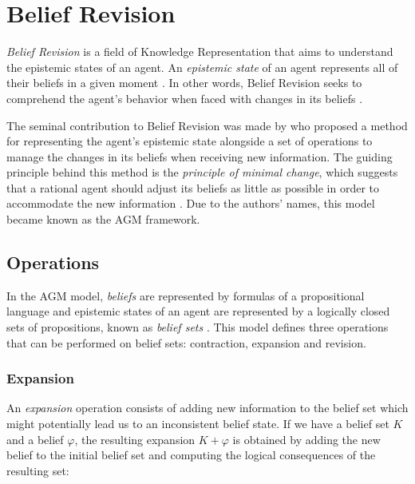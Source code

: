 
\chapter{Belief Revision}

\textit{Belief Revision} is a field of Knowledge Representation that aims to understand the epistemic states of an agent. An \textit{epistemic state} of an agent represents all of their beliefs in a given moment \citep{Ribeiro2010}. In other words, Belief Revision seeks to comprehend the agent's behavior when faced with changes in its beliefs \citep{Ribeiro2010,Matos2021}.

The seminal contribution to Belief Revision was made by \citet{AGM1985} who proposed a method for representing the agent's epistemic state alongside a set of operations to manage the changes in its beliefs when receiving new information. The guiding principle behind this method is the \textit{principle of minimal change}, which suggests that a rational agent should adjust its beliefs as little as possible in order to accommodate the new information \citep{Peppas2008}. Due to the authors' names, this model became known as the AGM framework.

\section{Operations}
\label{sec:operations}

In the AGM model, \textit{beliefs} are represented by formulas of a propositional language and epistemic states of an agent are represented by a logically closed sets of propositions, known as \textit{belief sets} \citep{Wassermann2000}. This model defines three operations that can be performed on belief sets: contraction, expansion and revision.

\subsection{Expansion}
\label{subsec:expansion}

An \textit{expansion} operation consists of adding new information to the belief set which might potentially lead us to an inconsistent belief state. If we have a belief set $K$ and a belief $\varphi$, the resulting expansion $K + \varphi$ is obtained by adding the new belief to the initial belief set and computing the logical consequences of the resulting set:


